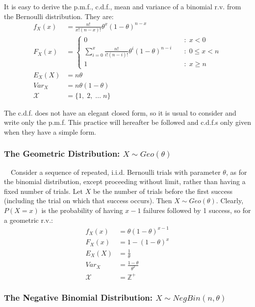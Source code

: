\documentclass[12pt,a4paper]{article}
\begin{document}
It is easy to derive the p.m.f., c.d.f., mean and variance of a binomial r.v. from the Bernoulli distribution. They are:
\begin{align*}
f_X(x) &= \frac{n!}{x! (n - x)!} \theta^x (1 - \theta)^{n - x}\\
F_X(x) &= \left\{ \begin{array}{cl} 0 \quad & : \; x < 0\\ \sum\limits_{i=0}^{x} \frac{n!}{i! (n - i)!} \theta^i (1 - \theta)^{n - i} \quad & : \; 0 \leq x < n\\ 1 \quad & : \; x \geq n \end{array} \right.\\
E_{X}(X) &= n\theta\\
Var_{X} &= n\theta(1-\theta)\\
\mathcal{X} &= \{1,\; 2,\; ... \; n\}
\end{align*}

The c.d.f. does not have an elegant closed form, so it is usual to consider and write only the p.m.f. This practice will hereafter be followed and c.d.f.s only given when they have a simple form.

\subsubsection{The Geometric Distribution: $X \sim Geo(\theta)$}

$\quad$Consider a sequence of repeated, i.i.d. Bernoulli trials with parameter $\theta$, as for the binomial distribution, except proceeding without limit, rather than having a fixed number of trials. Let $X$ be the number of trials before the first success (including the trial on which that success occurs). Then $X \sim Geo(\theta)$. Clearly, $P(X=x)$ is the probability of having $x-1$ failures followed by 1 success, so for a geometric r.v.:
\begin{align*}
f_X(x) &= \theta (1-\theta)^{x-1}\\
F_{X}(x) &= 1 - (1-\theta)^x\\
E_{X}(X) &= \frac{1}{\theta}\\
Var_{X} &= \frac{1-\theta}{\theta^2}\\
\mathcal{X} &= \mathbb{Z}^+
\end{align*}

\subsubsection{The Negative Binomial Distribution: $ X \sim NegBin(n,\theta)$}
\end{document}
